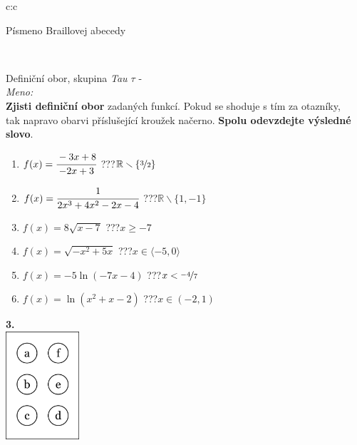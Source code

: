 \documentclass[10pt]{report}
\begin{document}
\begin{tabular}{c:c}
\begin{minipage}[c][99mm][t]{0.49\linewidth}
\begin{center}
\begin{minipage}{0.20\linewidth}
\begin{center}
{\small Písmeno Braillovej abecedy}
\end{center}
\end{minipage}
\end{center}
\end{minipage}
\\ \hdashline
\begin{minipage}[c][99mm][t]{0.49\linewidth}
\begin{center}
\vspace{7mm}
{\huge Definiční obor, skupina \textit{Tau $\tau$} -}\\[4.5mm]
\textit{Meno:}\phantom{xxxxxxxxxxxxxxxxxxxxxxxxxxxxxxxxxxxxxxxxxxxxxxxxxxxxxxxxxxxxxxxxx}\\[3.5mm]
\textbf{Zjisti definiční obor} zadaných funkcí. Pokud se shoduje s tím za otazníky,\\tak napravo obarvi příslušející kroužek načerno. \textbf{Spolu odevzdejte výsledné slovo}.\\[3mm]
\begin{minipage}{0.77\linewidth}
\begin{center}
\begin{varwidth}{\textwidth}
\begin{enumerate}
\normalsize
\item $f(x)=\cfrac{-3x+8}{-2x+3}$\quad \dotfill\; ???\;\dotfill \quad $\mathbb{R}\smallsetminus\{\nicefrac{3}{2}\}$
\item $f(x)=\cfrac{1}{2x^3+4x^2-2x-4}$\quad \dotfill\; ???\;\dotfill \quad $\mathbb{R}\smallsetminus\{1,-1\}$
\item $f(x)=8\sqrt{x-7}$\quad \dotfill\; ???\;\dotfill \quad $x\geq-7$
\item $f(x)=\sqrt{-x^2+5x}$\quad \dotfill\; ???\;\dotfill \quad $x\in\langle-5 , 0\rangle$
\item $f(x)=-5\ln{(-7x-4)}$\quad \dotfill\; ???\;\dotfill \quad $x<\nicefrac{-4}{7}$
\item $f(x)=\ln{(x^2+x-2)}$\quad \dotfill\; ???\;\dotfill \quad $x\in(-2 , 1)$
\end{enumerate}
\end{varwidth}
\end{center}
\end{minipage}
\begin{minipage}{0.20\linewidth}
\begin{center}
{\Huge\bfseries 3.} \\[2mm]
\includegraphics[height=40mm]{../images/braille.png}

\end{center}
\end{minipage}
\end{center}
\end{minipage}
\end{tabular}
\end{document}
